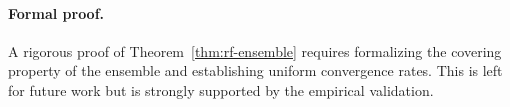 \documentclass{article}
\newcommand{\PP}{\mathbb{P}}
\begin{document}
\paragraph{Formal proof.}
A rigorous proof of Theorem~\ref{thm:rf-ensemble} requires formalizing the covering property of the ensemble and establishing uniform convergence rates. This is left for future work but is strongly supported by the empirical validation.




\end{document}
